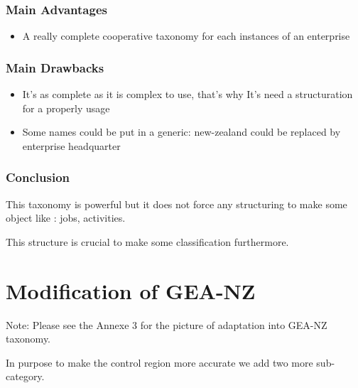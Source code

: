 \documentclass[12pt]{report}
\begin{document}
\subsubsection*{Main Advantages }
\begin{itemize}
	\item A really complete cooperative taxonomy for each instances of an enterprise\par

\end{itemize}

\subsubsection*{Main Drawbacks }
\begin{itemize}
	\item It’s as complete as it is complex to use, that’s why It’s need a structuration for a properly usage\par
	\item Some names could be put in a generic: new-zealand could be replaced by enterprise headquarter \par


\end{itemize}\subsubsection*{ Conclusion }

This taxonomy is powerful but it does not force any structuring to make some object like : jobs, activities. \par \par
This structure is crucial to make some classification furthermore.





\newpage

\vspace{\baselineskip}\section*{Modification of GEA-NZ }
Note: Please see the Annexe 3 for the picture of adaptation into GEA-NZ taxonomy. \par
In purpose to make the control region more accurate we add two more sub-category. \par
\end{document}
